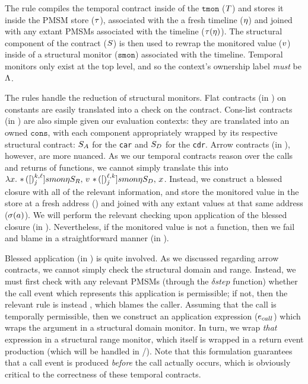 %
The  rule compiles the temporal contract inside of the $\mathtt{tmon}$ ($T$) and stores it inside the PMSM store ($\tau$), associated with the a fresh timeline ($\eta$) and joined with any extant PMSMs associated with the timeline ($\tau(\eta)$).
%
The structural component of the contract ($S$) is then used to rewrap the monitored value ($v$) inside of a structural monitor ($\mathtt{smon}$) associated with the timeline.
%
Temporal monitors only exist at the top level, and so the context's ownership label \emph{must} be $\Lambda$.
%

%
The  rules handle the reduction of structural monitors.
%
Flat contracts (in ) on constants are easily translated into a check on the contract.
%
Cons-list contracts (in ) are also simple given our evaluation contexts: they are translated into an owned $\mathtt{cons}$, with each component appropriately wrapped by its respective structural contract: $S_A$ for the \texttt{car} and $S_D$ for the \texttt{cdr}.
%
%
Arrow contracts (in ), however, are more nuanced.
%
As we our temporal contracts reason over the calls and returns of functions, we cannot simply translate this into \eg\ $\lambda x.\  {\tt *}{\,}({[})^{k,\ell}_{j}]{smon}{\eta}{S_R,\,  v\ {\tt *}{\,}({[})^{\ell,k}_{j}]{smon}{\eta}{S_D,\, x} }$.
%
Instead, we construct a blessed closure with all of the relevant information, and store the monitored value in the store at a fresh address (\maddr) and joined with any extant values at that same address ($\sigma(a)$).
%
We will perform the relevant checking upon application of the blessed closure (in ).
%
Nevertheless, if the monitored value is not a function, then we fail and blame in a straightforward manner (in ).
%

%
Blessed application (in ) is quite involved.
%
As we discussed regarding arrow contracts, we cannot simply check the structural domain and range.
%
Instead, we must first check with any relevant PMSMs (through the $\delta{}step$ function) whether the call event which represents this application is permissible; if not, then the relevant rule is instead , which blames the caller.
%
Assuming that the call is temporally permissible, then we construct an application expression ($e_{call}$) which wraps the argument in a structural domain monitor.
%
In turn, we wrap \emph{that} expression in a structural range monitor, which itself is wrapped in a return event production (which will be handled in /).
%
Note that this formulation guarantees that a call event is produced \emph{before} the call actually occurs, which is obviously critical to the correctness of these temporal contracts.
%

